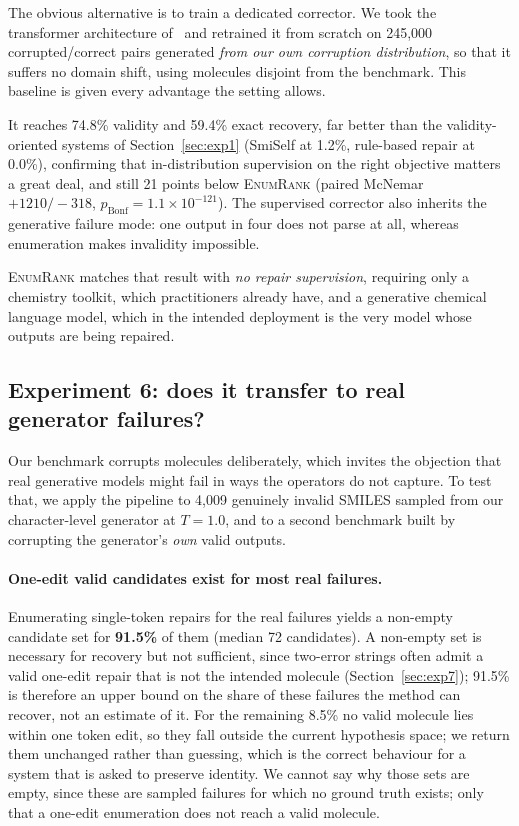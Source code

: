 \documentclass[journal=jcisd8,manuscript=article]{achemso}
\newcommand{\ours}{\textsc{EnumRank}}
\begin{document}
The obvious alternative is to train a dedicated corrector. We took the
transformer architecture of~\citet{schoenmaker2023uncorrupt} and retrained it from
scratch on 245{,}000 corrupted/correct pairs generated \emph{from our own
corruption distribution}, so that it suffers no domain shift, using molecules
disjoint from the benchmark. This baseline is given every advantage the setting
allows.

It reaches 74.8\% validity and 59.4\% exact recovery, far better than the
validity-oriented systems of Section~\ref{sec:exp1} (SmiSelf at 1.2\%,
rule-based repair at 0.0\%), confirming that in-distribution supervision on the
right objective matters a great deal, and still 21 points below \ours{} (paired
McNemar $+1210/{-}318$, $p_{\text{Bonf}} = 1.1\times10^{-121}$). The supervised
corrector also inherits the generative failure mode: one output in four does not
parse at all, whereas enumeration makes invalidity impossible.

\ours{} matches that result with \emph{no repair supervision}, requiring only a
chemistry toolkit, which practitioners already have, and a generative chemical
language model, which in the intended deployment is the very model whose outputs
are being repaired.

\subsection{Experiment 6: does it transfer to real generator failures?}\label{sec:exp6}

Our benchmark corrupts molecules deliberately, which invites the objection that
real generative models might fail in ways the operators do not capture. To test
that, we apply the pipeline to 4{,}009 genuinely invalid SMILES sampled from our
character-level generator at $T=1.0$, and to a second benchmark built by
corrupting the generator's \emph{own} valid outputs.

\paragraph{One-edit valid candidates exist for most real failures.}
Enumerating single-token repairs for the real failures yields a non-empty
candidate set for \textbf{91.5\%} of them (median 72 candidates). A non-empty
set is necessary for recovery but not sufficient, since two-error strings often
admit a valid one-edit repair that is not the intended molecule
(Section~\ref{sec:exp7}); 91.5\% is therefore an upper bound on the share of these
failures the method can recover, not an estimate of it. For the remaining 8.5\% no valid molecule lies within one
token edit, so they fall outside the current hypothesis space; we return them
unchanged rather than guessing, which is the correct behaviour for a system that
is asked to preserve identity. We cannot say why those sets are empty, since
these are sampled failures for which no ground truth exists; only that a one-edit
enumeration does not reach a valid molecule.
\end{document}
